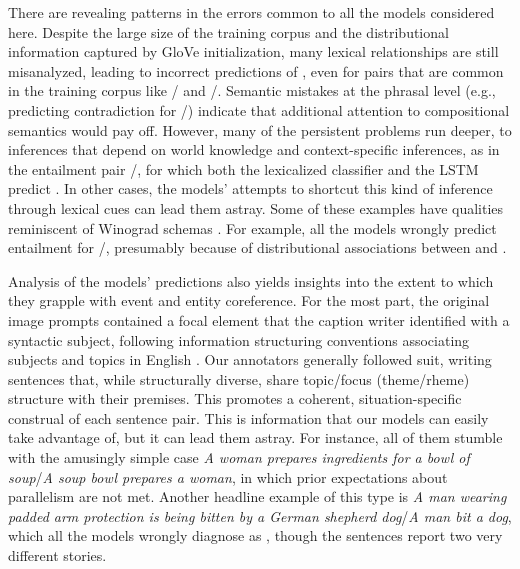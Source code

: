 There are revealing patterns in the errors common to all the models
considered here. Despite the large size of the training corpus and the
distributional information captured by GloVe initialization, many
lexical relationships are still misanalyzed, leading to incorrect
predictions of , even for pairs that are common in the
training corpus like / and
/. Semantic mistakes at the phrasal level
(e.g., predicting contradiction for /) indicate
that additional attention to compositional semantics would pay off.
%
However, many of the persistent problems run deeper, to inferences
that depend on world knowledge and context-specific inferences, as in
the entailment pair /, for which both
the lexicalized classifier and the LSTM predict . 
In other cases, the models' attempts to shortcut this kind of inference 
through lexical cues can lead them astray. 
Some of these examples have qualities
reminiscent of Winograd schemas \cite{Winograd:1972,Levesque:2013}. For
example, all the models wrongly predict
entailment for /, presumably because of
distributional associations between  and .

Analysis of the models' predictions also yields insights into the
extent to which they grapple with event and entity coreference. For
the most part, the original image prompts contained a focal element
that the caption writer identified with a syntactic subject, following
information structuring conventions associating subjects and topics in
English \cite{Ward04}. Our annotators generally followed suit, writing
sentences that, while structurally diverse, share topic/focus (theme/rheme)
structure with their premises.
This promotes a coherent, situation-specific construal of each sentence
pair. This is information that our models can easily take advantage
of, but it can lead them astray. For instance, all of them stumble
with the amusingly simple case \emph{A woman prepares ingredients for
  a bowl of soup}/\emph{A soup bowl prepares a woman}, in which prior
expectations about parallelism are not met. Another headline example
of this type is \emph{A man wearing padded arm protection is being
  bitten by a German shepherd dog}/\emph{A man bit a dog}, which all
the models wrongly diagnose as , though the sentences
report two very different stories.

